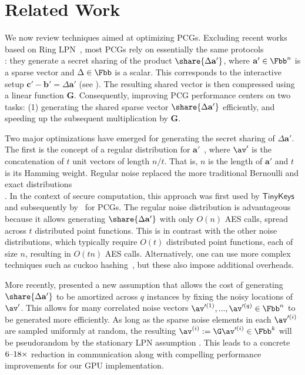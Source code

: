 \section{Related Work}\label{sec:relwork}

  We now review techniques aimed at optimizing PCGs. Excluding recent works based on Ring LPN~\cite{ringLpn,foleage,pcgAnyField}, most PCGs rely on essentially the same protocols~\cite{CCS:BCGI18,silentOTCCS,silentOTcrypto,ringLpn,silver,EA} \\\noindent \cite{EC,structuredlpn}: they generate a secret sharing of the product \(\share{\Delta \mathbf{a}'}\), where \(\mathbf{a}'\in \Fbb^n\) is a sparse vector and \(\Delta\in \Fbb\) is a scalar. This corresponds to the interactive setup \(\mathbf{c}' - \mathbf{b}' = \Delta \mathbf{a}'\) (see ). The resulting shared vector is then compressed using a linear function \(\mathbf{G}\). Consequently, improving PCG performance centers on two tasks: (1) generating the shared sparse vector \(\share{\Delta \mathbf{a}'}\) efficiently, and speeding up the subsequent multiplication by \(\mathbf{G}\).

Two major optimizations have emerged for generating the secret sharing of \(\Delta \mathbf{a}'\). The first is the concept of a regular distribution for \(\mathbf{a}'\)~\cite{AFS05}, where $\av'$ is the concatenation of $t$ unit vectors of length $n/t$. That is, \(n\) is the length of \(\mathbf{a}'\) and  \(t\) is its Hamming weight. Regular noise replaced the more traditional Bernoulli and exact distributions~\cite{AFS05,C:HOSS18,CCS:DoeShe17,CCS:BCGI18,CCS:SGRR19,silentOTCCS}\\ \cite{silentOTcrypto,ringLpn,EA}. 
In the context of secure computation, this approach was first used by \(\mathsf{TinyKeys}\)~\cite{C:HOSS18} and subsequently by~\cite{CCS:BCGI18} for PCGs. 
The regular noise distribution is advantageous because it allows generating \(\share{\Delta \mathbf{a}'}\) with only \(O(n)\) AES calls, spread across \(t\) distributed point functions.
This is in contrast with the other noise distributions, which typically require \(O(t)\) distributed point functions, each of size $n$, resulting in \(O(tn)\) AES calls. Alternatively, one can use more complex techniques such as cuckoo hashing~\cite{CCS:SGRR19}, but these also impose additional overheads.

More recently, \cite{structuredlpn} presented a new assumption that allows the cost of generating \(\share{\Delta \mathbf{a}'}\) to be amortized across \(q\) instances by fixing the noisy locations of $\av'$. This allows for many correlated noise vectors $\av'^{(1)},...,\av'^{(q)}\in \Fbb^n$ to be generated more efficiently.
As long as the sparse noise elements in each $\av'^{(i)}$ are sampled uniformly at random, the resulting $\av^{(i)}:=\G\av'^{(i)}\in \Fbb^k$ will be pseudorandom by the stationary LPN assumption \cite{structuredlpn}.
This leads to a concrete \(6\textup{--}18\times\) reduction in communication along with compelling performance improvements for our GPU implementation.


